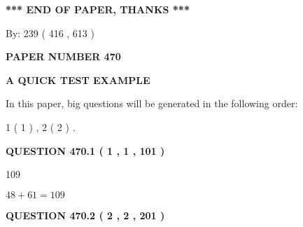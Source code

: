 \documentclass[12pt]{article}
\begin{document}
 
 
 
   
   
 \vspace{0.2in}
 
   
   
   
   
\vspace{1.0in} 
{\textbf{\large{ *** END OF PAPER, THANKS *** }}} 
   
   
\hspace{1.0in} By: 
 239 ( 416 ,  613 )
   
   
   
   
\newpage 
\setcounter{page}{ 
   470001 } 
   
   
   
   
 {\textbf{ \Large{ PAPER NUMBER  470  }}}
   
   
\vspace{0.2in}
   
   
   
   
   
   
 \vspace{0.2in}
{\LARGE {\textbf{ A QUICK TEST EXAMPLE}}}
   
   
   
\vspace{0.2in}
   
In this paper, big questions will be generated in the following order: 
   
   
   1 ( 1 )
 ,
   2 ( 2 )
 .
  
\vspace{0.2in}
  
{\textbf{\Large{QUESTION
470.1 
 ( 1 , 1 , 101 )
}}}
  
  
 
 
\noindent{}

109
 
 
 
 
\noindent{}

$ %
48 +  %
61=   %
109$
 
 
  
\vspace{0.2in}
  
{\textbf{\Large{QUESTION
470.2 
 ( 2 , 2 , 201 )
}}}
  
\end{document}
